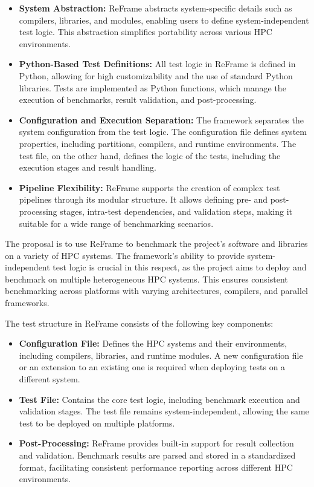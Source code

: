 \begin{itemize}
    \item \textbf{System Abstraction:} ReFrame abstracts system-specific details such as compilers, libraries, and modules, enabling users to define system-independent test logic. This abstraction simplifies portability across various HPC environments.
    \item \textbf{Python-Based Test Definitions:} All test logic in ReFrame is defined in Python, allowing for high customizability and the use of standard Python libraries. Tests are implemented as Python functions, which manage the execution of benchmarks, result validation, and post-processing.
    \item \textbf{Configuration and Execution Separation:} The framework separates the system configuration from the test logic. The configuration file defines system properties, including partitions, compilers, and runtime environments. The test file, on the other hand, defines the logic of the tests, including the execution stages and result handling.
    \item \textbf{Pipeline Flexibility:} ReFrame supports the creation of complex test pipelines through its modular structure. It allows defining pre- and post-processing stages, intra-test dependencies, and validation steps, making it suitable for a wide range of benchmarking scenarios.
\end{itemize}


The proposal is to use ReFrame  to benchmark the project's software and libraries on a variety of HPC systems. 
The framework's ability to provide system-independent test logic is crucial in this respect, as the project aims to deploy and benchmark  on multiple heterogeneous HPC systems. 
This ensures consistent benchmarking across platforms with varying architectures, compilers, and parallel frameworks.

The test structure in ReFrame consists of the following key components:

\begin{itemize}
    \item \textbf{Configuration File:} Defines the HPC systems and their environments, including compilers, libraries, and runtime modules. A new configuration file or an extension to an existing one is required when deploying tests on a different system.
    \item \textbf{Test File:} Contains the core test logic, including benchmark execution and validation stages. The test file remains system-independent, allowing the same test to be deployed on multiple platforms.
    \item \textbf{Post-Processing:} ReFrame provides built-in support for result collection and validation. Benchmark results are parsed and stored in a standardized format, facilitating consistent performance reporting across different HPC environments.
\end{itemize}

